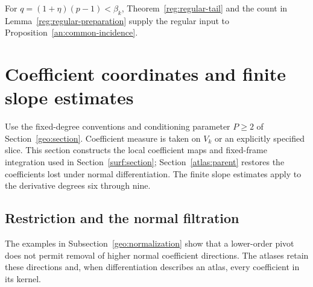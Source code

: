 \documentclass[11pt]{amsart}
\theoremstyle{definition}
\theoremstyle{remark}
\numberwithin{equation}{section}
\begin{document}
For $q=(1+\eta)(p-1)<\beta_k$, Theorem~\ref{reg:regular-tail} and the count in Lemma~\ref{reg:regular-preparation} supply the regular input to Proposition~\ref{an:common-incidence}.

\section{Coefficient coordinates and finite slope estimates}\label{atlas:section}

Use the fixed-degree conventions and conditioning parameter $P\ge2$ of Section~\ref{geo:section}. Coefficient measure is taken on $V_k$ or an explicitly specified slice. This section constructs the local coefficient maps and fixed-frame integration used in Section~\ref{surf:section}; Section~\ref{atlas:parent} restores the coefficients lost under normal differentiation. The finite slope estimates apply to the derivative degrees six through nine.

\subsection{Restriction and the normal filtration}\label{atlas:restriction}

The examples in Subsection~\ref{geo:normalization} show that a lower-order pivot does not permit removal of higher normal coefficient directions. The atlases retain these directions and, when differentiation describes an atlas, every coefficient in its kernel.
\end{document}
